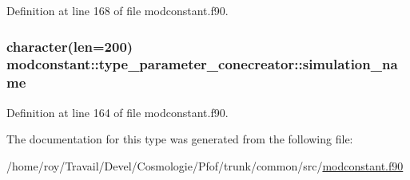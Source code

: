 Definition at line 168 of file modconstant.\+f90.

\subsubsection[{\texorpdfstring{simulation\+\_\+name}{simulation_name}}]{\setlength{\rightskip}{0pt plus 5cm}character(len=200) modconstant\+::type\+\_\+parameter\+\_\+conecreator\+::simulation\+\_\+name}\hypertarget{structmodconstant_1_1type__parameter__conecreator_af7518143511653280193e1cd3ecacb8c}{}\label{structmodconstant_1_1type__parameter__conecreator_af7518143511653280193e1cd3ecacb8c}


Definition at line 164 of file modconstant.\+f90.



The documentation for this type was generated from the following file\+:\begin{DoxyCompactItemize}
\item 
/home/roy/\+Travail/\+Devel/\+Cosmologie/\+Pfof/trunk/common/src/\hyperlink{modconstant_8f90}{modconstant.\+f90}\end{DoxyCompactItemize}
